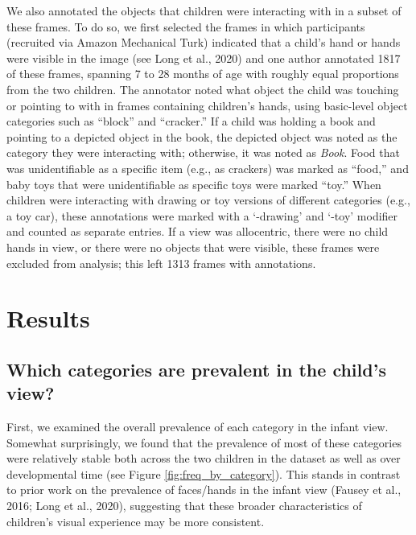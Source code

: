 \documentclass[10pt, letterpaper]{article}
\begin{document}
We also annotated the objects that children were interacting with in a
subset of these frames. To do so, we first selected the frames in which
participants (recruited via Amazon Mechanical Turk) indicated that a
child's hand or hands were visible in the image (see Long et al., 2020)
and one author annotated 1817 of these frames, spanning 7 to 28 months
of age with roughly equal proportions from the two children. The
annotator noted what object the child was touching or pointing to with
in frames containing children's hands, using basic-level object
categories such as ``block'' and ``cracker.'' If a child was holding a
book and pointing to a depicted object in the book, the depicted object
was noted as the category they were interacting with; otherwise, it was
noted as \emph{Book}. Food that was unidentifiable as a specific item
(e.g., as crackers) was marked as ``food,'' and baby toys that were
unidentifiable as specific toys were marked ``toy.'' When children were
interacting with drawing or toy versions of different categories (e.g.,
a toy car), these annotations were marked with a `-drawing' and `-toy'
modifier and counted as separate entries. If a view was allocentric,
there were no child hands in view, or there were no objects that were
visible, these frames were excluded from analysis; this left 1313 frames
with annotations.

\hypertarget{results}{%
\section{Results}\label{results}}

\hypertarget{which-categories-are-prevalent-in-the-childs-view}{%
\subsection{Which categories are prevalent in the child's
view?}\label{which-categories-are-prevalent-in-the-childs-view}}

First, we examined the overall prevalence of each category in the infant
view. Somewhat surprisingly, we found that the prevalence of most of
these categories were relatively stable both across the two children in
the dataset as well as over developmental time (see Figure
\ref{fig:freq_by_category}). This stands in contrast to prior work on
the prevalence of faces/hands in the infant view (Fausey et al., 2016;
Long et al., 2020), suggesting that these broader characteristics of
children's visual experience may be more consistent.
\end{document}
